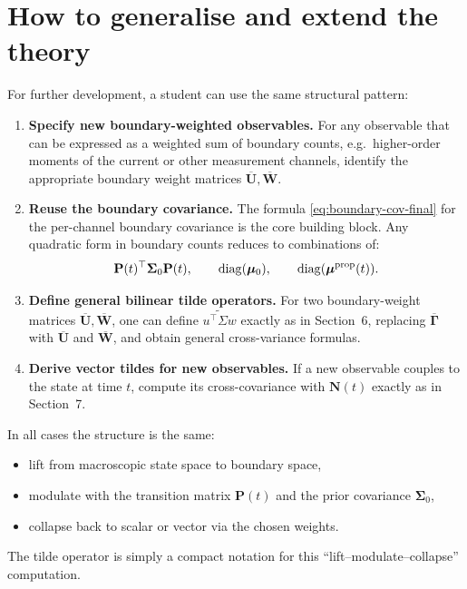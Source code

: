 \documentclass[11pt]{article}
\begin{document}
\section{How to generalise and extend the theory}

For further development, a student can use the same structural pattern:

\begin{enumerate}
  \item \textbf{Specify new boundary-weighted observables.}  
  For any observable that can be expressed as a weighted sum of boundary counts,
  e.g.\ higher-order moments of the current or other measurement channels,
  identify the appropriate boundary weight matrices
  \(\overline{\mathbf{U}},\overline{\mathbf{W}}\).

  \item \textbf{Reuse the boundary covariance.}  
  The formula \eqref{eq:boundary-cov-final} for the per-channel boundary
  covariance is the core building block. Any quadratic form in boundary counts
  reduces to combinations of:
  \[
    \mathbf{P}(t)^\top \boldsymbol{\Sigma}_0 \mathbf{P}(t),
    \qquad
    \operatorname{diag}(\boldsymbol{\mu}_0),
    \qquad
    \operatorname{diag}(\boldsymbol{\mu}^{\text{prop}}(t)).
  \]

  \item \textbf{Define general bilinear tilde operators.}  
  For two boundary-weight matrices
  \(\overline{\mathbf{U}},\overline{\mathbf{W}}\), one can define
  \(\widetilde{u^\top\Sigma w}\) exactly as in Section~6, replacing
  \(\overline{\mathbf{\Gamma}}\) with \(\overline{\mathbf{U}}\) and
  \(\overline{\mathbf{W}}\), and obtain general cross-variance formulas.

  \item \textbf{Derive vector tildes for new observables.}  
  If a new observable couples to the state at time \(t\), compute its
  cross-covariance with \(\mathbf{N}(t)\) exactly as in Section~7.
\end{enumerate}

In all cases the structure is the same:
\begin{itemize}
  \item lift from macroscopic state space to boundary space,
  \item modulate with the transition matrix \(\mathbf{P}(t)\) and the prior
  covariance \(\boldsymbol{\Sigma}_0\),
  \item collapse back to scalar or vector via the chosen weights.
\end{itemize}
The tilde operator is simply a compact notation for this
``lift--modulate--collapse'' computation.
\end{document}
